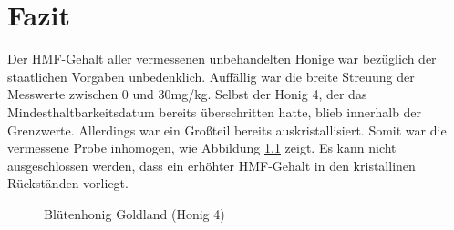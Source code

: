 \chapter{Fazit}
Der HMF-Gehalt aller vermessenen unbehandelten Honige war bezüglich der staatlichen Vorgaben unbedenklich. Auffällig war die breite Streuung der Messwerte zwischen 0 und 30mg/kg. Selbst der Honig 4, der das Mindesthaltbarkeitsdatum bereits überschritten hatte, blieb innerhalb der Grenzwerte. Allerdings war ein Großteil bereits auskristallisiert. Somit war die vermessene Probe inhomogen, wie Abbildung \ref{fig:Blütenhonig} zeigt. Es kann nicht ausgeschlossen werden, dass ein erhöhter HMF-Gehalt in den kristallinen Rückständen vorliegt.\\
\begin{figure}[htbp]
  \centering
  \caption{Blütenhonig Goldland (Honig 4)}
  \label{fig:Blütenhonig}
\end{figure}

